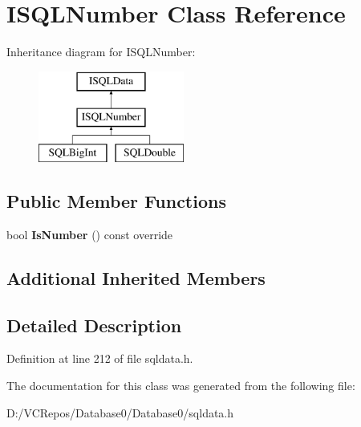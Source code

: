 \hypertarget{class_i_s_q_l_number}{}\section{I\+S\+Q\+L\+Number Class Reference}
\label{class_i_s_q_l_number}
Inheritance diagram for I\+S\+Q\+L\+Number\+:\begin{figure}[H]
\begin{center}
\leavevmode
\includegraphics[height=3.000000cm]{class_i_s_q_l_number}
\end{center}
\end{figure}
\subsection*{Public Member Functions}
\begin{DoxyCompactItemize}
\item 
\mbox{\label{class_i_s_q_l_number_a859d8e9e532a93c4fdd8007d0723794d}} 
bool {\bfseries Is\+Number} () const override
\end{DoxyCompactItemize}
\subsection*{Additional Inherited Members}


\subsection{Detailed Description}


Definition at line 212 of file sqldata.\+h.



The documentation for this class was generated from the following file\+:\begin{DoxyCompactItemize}
\item 
D\+:/\+V\+C\+Repos/\+Database0/\+Database0/sqldata.\+h\end{DoxyCompactItemize}
